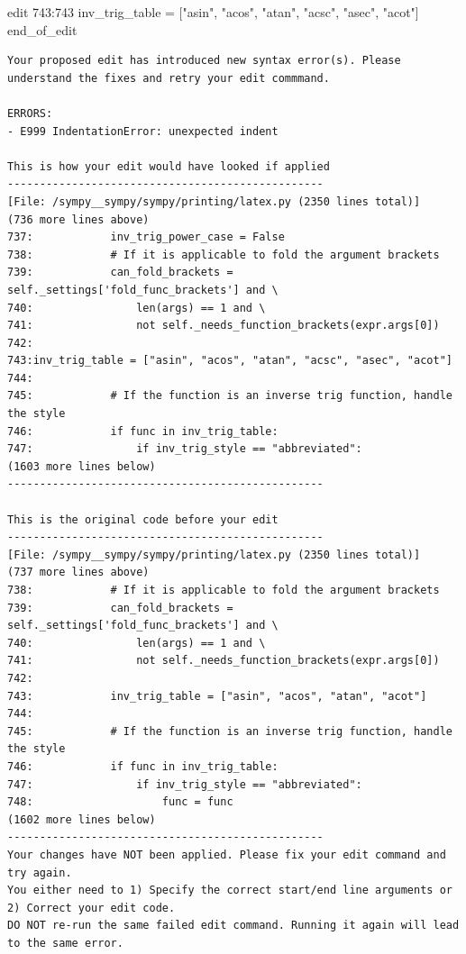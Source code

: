 {\begin{agentbox}
\hrulefill
\begin{CodeVerbatim}[breaklines=true, breakanywhere=true]
edit 743:743
inv_trig_table = ["asin", "acos", "atan", "acsc", "asec", "acot"]
end_of_edit
\end{CodeVerbatim}
\end{agentbox}
\begin{observationbox}\begin{Verbatim}[breaklines=true, breakanywhere=true]
Your proposed edit has introduced new syntax error(s). Please understand the fixes and retry your edit commmand.

ERRORS:
- E999 IndentationError: unexpected indent

This is how your edit would have looked if applied
-------------------------------------------------
[File: /sympy__sympy/sympy/printing/latex.py (2350 lines total)]
(736 more lines above)
737:            inv_trig_power_case = False
738:            # If it is applicable to fold the argument brackets
739:            can_fold_brackets = self._settings['fold_func_brackets'] and \
740:                len(args) == 1 and \
741:                not self._needs_function_brackets(expr.args[0])
742:
743:inv_trig_table = ["asin", "acos", "atan", "acsc", "asec", "acot"]
744:
745:            # If the function is an inverse trig function, handle the style
746:            if func in inv_trig_table:
747:                if inv_trig_style == "abbreviated":
(1603 more lines below)
-------------------------------------------------

This is the original code before your edit
-------------------------------------------------
[File: /sympy__sympy/sympy/printing/latex.py (2350 lines total)]
(737 more lines above)
738:            # If it is applicable to fold the argument brackets
739:            can_fold_brackets = self._settings['fold_func_brackets'] and \
740:                len(args) == 1 and \
741:                not self._needs_function_brackets(expr.args[0])
742:
743:            inv_trig_table = ["asin", "acos", "atan", "acot"]
744:
745:            # If the function is an inverse trig function, handle the style
746:            if func in inv_trig_table:
747:                if inv_trig_style == "abbreviated":
748:                    func = func
(1602 more lines below)
-------------------------------------------------
Your changes have NOT been applied. Please fix your edit command and try again.
You either need to 1) Specify the correct start/end line arguments or 2) Correct your edit code.
DO NOT re-run the same failed edit command. Running it again will lead to the same error.


\end{Verbatim}
\end{observationbox}}

